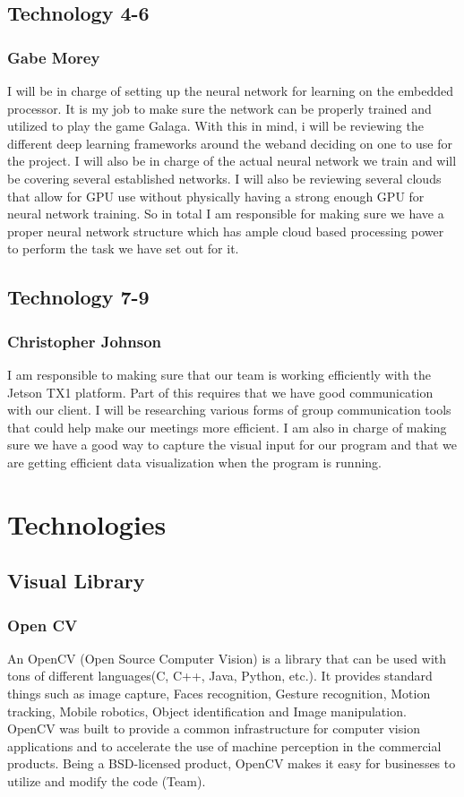 \section{Technology 4-6}
\subsection{Gabe Morey}
I will be in charge of setting up the neural network for learning on the embedded processor. 
It is my job to make sure the network can be properly trained and utilized to play the game Galaga.
With this in mind, i will be reviewing the different deep learning frameworks around the weband deciding on one to use for the project. 
I will also be in charge of the actual neural network we train and will be covering several established networks. 
I will also be reviewing several clouds that allow for GPU use without physically having a strong enough GPU for neural network training. So in total I am responsible for making sure we have a proper neural network structure which has ample cloud based processing power to perform the task we have set out for it.

\section{Technology 7-9}
\subsection{Christopher Johnson}
I am responsible to making sure that our team is working efficiently with the Jetson TX1 platform.
Part of this requires that we have good communication with our client.
I will be researching various forms of group communication tools that could help make our meetings more efficient.
I am also in charge of making sure we have a good way to capture the visual input for our program and that we are getting efficient data visualization when the program is running.

\chapter{Technologies}
\section{Visual Library}
\subsection{Open CV}
An OpenCV (Open Source Computer Vision) is a library that can be used with tons of different languages(C, C++, Java, Python, etc.).
 It provides standard things such as image capture, Faces recognition, Gesture recognition, Motion tracking, Mobile robotics, Object identification and Image manipulation.
 OpenCV was built to provide a common infrastructure for computer vision applications and to accelerate the use of machine perception in the commercial products.
 Being a BSD-licensed product, OpenCV makes it easy for businesses to utilize and modify the code (Team).
